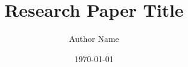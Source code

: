 \documentclass[12pt,a4paper]{article}
\title{Research Paper Title}
\author{Author Name}
\date{\today}
\begin{document}
\maketitle

\begin{abstract}
\end{abstract}

\doublespacing











\end{document}
